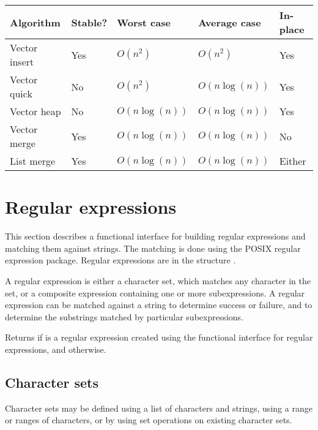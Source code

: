 \begin{center}
  \begin{tabular}{lllll}
Algorithm &    Stable? & Worst case &  Average case &  In-place\\
\hline
Vector insert & Yes&      $O(n^2)$ &     $O(n^2)$&        Yes\\
Vector quick  & No &      $O(n^2)$  &    $O(n\log(n))$&     Yes\\
Vector heap   & No &      $O(n\log(n))$&   $O(n\log(n))$&     Yes\\
Vector merge  & Yes&      $O(n\log(n))$&   $O(n\log(n))$&     No\\
List merge    & Yes&      $O(n\log(n))$&   $O(n\log(n))$&     Either
\end{tabular}
\end{center}

\section{Regular expressions}
\label{regexp-adt}

This section describes a functional interface for building regular
 expressions and matching them against strings.
The matching is done using the POSIX regular expression package.
Regular expressions are in the structure .

A regular expression is either a character set, which matches any character
in the set, or a composite expression containing one or more subexpressions.
A regular expression can be matched against a string to determine success
or failure, and to determine the substrings matched by particular subexpressions.

\begin{protos}
\end{protos}
\noindent
Returns  if  is a regular expression created
using the functional interface for regular expressions, and 
otherwise.

\subsection{Character sets}

Character sets may be defined using a list of characters and strings,
using a range or ranges of characters, or by using set operations on
existing character sets.

